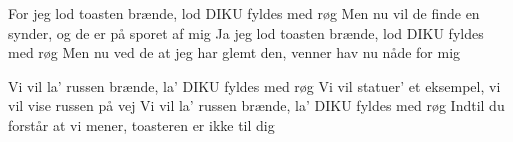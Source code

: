\documentclass[a4paper,11pt]{article}
\begin{document}
\begin{song}
%
For jeg lod toasten brænde, lod DIKU fyldes med røg
Men nu vil de finde en synder, og de er på sporet af mig
Ja jeg lod toasten brænde, lod DIKU fyldes med røg
Men nu ved de at jeg har glemt den, venner hav nu nåde for mig


%
Vi vil la' russen brænde, la' DIKU fyldes med røg
Vi vil statuer' et eksempel, vi vil vise russen på vej
Vi vil la' russen brænde, la' DIKU fyldes med røg
Indtil du forstår at vi mener, toasteren er ikke til dig
\end{song}
\end{document}
